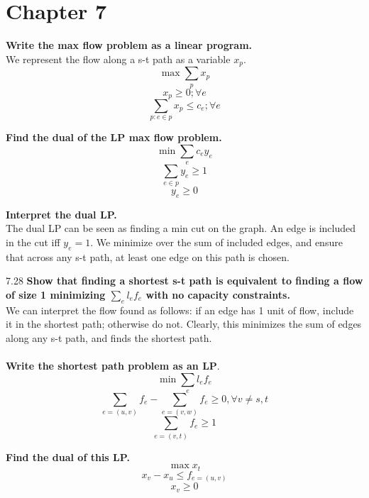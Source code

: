 \section{Chapter 7}

\begin{problem}{7.25}
    \textbf{Write the max flow problem as a linear program.} \\
    We represent the flow along a s-t path as a variable $x_p$.
    \[
        \max \sum_p x_p
    \]
    \[
        x_p \geq 0; \forall e
    \]
    \[
        \sum_{p: e \in p} x_p \leq c_e; \forall e
    \]
    
    \textbf{Find the dual of the LP max flow problem.}
    \[
        \min \sum_e c_ey_e
    \]
    \[
        \sum_{e \in p} y_e \geq 1
    \]
    \[
        y_e \geq 0
    \]
    
    \textbf{Interpret the dual LP.} \\
    The dual LP can be seen as finding a min cut on the graph. An edge is included in the cut iff $y_e = 1$. We minimize over the sum of included edges, and ensure that across any s-t path, at least one edge on this path is chosen.
\end{problem}

\begin{problem} {7.28}
    \textbf{Show that finding a shortest s-t path is equivalent to finding a flow of size 1 minimizing $\sum_e l_ef_e$ with no capacity constraints.} \\
    We can interpret the flow found as follows: if an edge has 1 unit of flow, include it in the shortest path; otherwise do not. Clearly, this minimizes the sum of edges along any s-t path, and finds the shortest path. \\ \\
    \textbf{Write the shortest path problem as an LP}. \\
    \[
        \min \sum_e l_ef_e
    \]
    \[
        \sum_{e=(u, v)} f_e - \sum_{e=(v, w)} f_e \geq 0, \forall v \neq s, t
    \]
    \[
        \sum_{e = (v, t)} f_e \geq 1
    \]
    
    \textbf{Find the dual of this LP.} \\
    \[
        \max x_t
    \]
    \[
        x_v - x_u \leq f_{e = (u, v)}
    \]
    \[
        x_v \geq 0
    \]
\end{problem}

